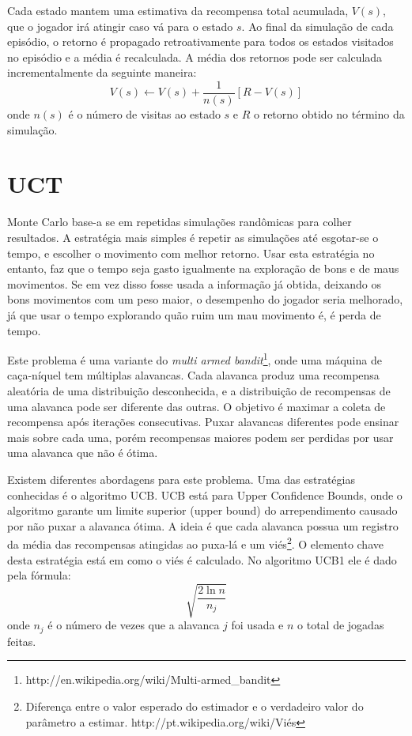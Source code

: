 Cada estado mantem uma estimativa da recompensa total acumulada, $V(s)$, que o jogador irá atingir caso vá para o estado $s$. Ao final da simulação de cada episódio, o retorno é propagado retroativamente para todos os estados visitados no episódio e a média é recalculada. A média dos retornos pode ser calculada incrementalmente da seguinte maneira:
\begin{equation}
V(s) \leftarrow V(s) + \frac{1}{n(s)}[R - V(s)]
\end{equation}
onde $n(s)$ é o número de visitas ao estado $s$ e $R$ o retorno obtido no término da simulação. 

\section{UCT}
Monte Carlo base-a se em repetidas simulações randômicas para colher resultados. A estratégia mais simples é repetir as simulações até esgotar-se o tempo, e escolher o movimento com melhor retorno. Usar esta estratégia no entanto, faz que o tempo seja gasto igualmente na exploração de bons e de maus movimentos. Se em vez disso fosse usada a informação já obtida, deixando os bons movimentos com um peso maior, o desempenho do jogador seria melhorado, já que usar o tempo explorando quão ruim um mau movimento é, é perda de tempo. 

Este problema é uma variante do \textit{multi armed bandit}\footnote{http://en.wikipedia.org/wiki/Multi-armed\_bandit}, onde uma máquina de caça-níquel tem múltiplas alavancas. Cada alavanca produz uma recompensa aleatória de uma distribuição desconhecida, e a distribuição de recompensas de uma alavanca pode ser diferente das outras. O objetivo é maximar a coleta de recompensa após iterações consecutivas. Puxar alavancas diferentes pode ensinar mais sobre cada uma, porém recompensas maiores podem ser perdidas por usar uma alavanca que não é ótima.

Existem diferentes abordagens para este problema. Uma das estratégias conhecidas é o algoritmo UCB\cite{ucb}. UCB está para Upper Confidence Bounds, onde o algoritmo garante um limite superior (upper bound) do arrependimento causado por não puxar a alavanca ótima. A ideia é que cada alavanca possua um registro da média das recompensas atingidas ao puxa-lá e um viés\footnote{Diferença entre o valor esperado do estimador e o verdadeiro valor do parâmetro a estimar. http://pt.wikipedia.org/wiki/Viés}. O elemento chave desta estratégia está em como o viés é calculado. No algoritmo UCB1 ele é dado pela fórmula:
\begin{equation}
\sqrt{\frac{2\ln n}{n_{j}}}
\end{equation}
onde $n_{j}$ é o número de vezes que a alavanca $j$ foi usada e $n$ o total de jogadas feitas. 

